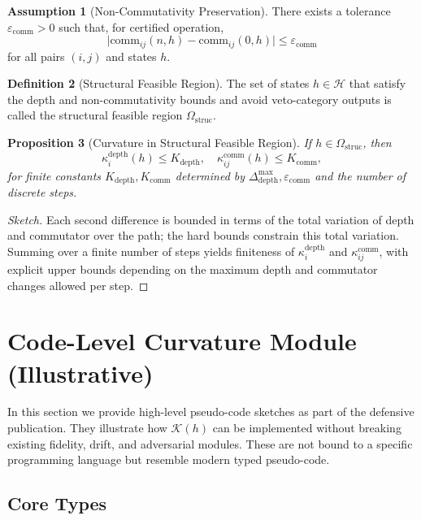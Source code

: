 \documentclass[11pt]{article}
\theoremstyle{definition}
\newtheorem{defn}{Definition}[section]
\newtheorem{assump}[defn]{Assumption}
\theoremstyle{plain}
\newtheorem{prop}[defn]{Proposition}
\theoremstyle{remark}
\begin{document}
\begin{assump}[Non-Commutativity Preservation]
There exists a tolerance \(\varepsilon_{\text{comm}}>0\) such that, for certified operation,
\[
  \big|\text{comm}_{ij}(n,h) - \text{comm}_{ij}(0,h)\big|
  \le \varepsilon_{\text{comm}}
\]
for all pairs \((i,j)\) and states \(h\).
\end{assump}

\begin{defn}[Structural Feasible Region]
The set of states \(h \in \mathcal{H}\) that satisfy the depth and non-commutativity bounds and avoid veto-category outputs is called the structural feasible region \(\Omega_{\text{struc}}\).
\end{defn}

\begin{prop}[Curvature in Structural Feasible Region]
If \(h \in \Omega_{\text{struc}}\), then
\[
  \kappa_i^{\text{depth}}(h) \le K_{\text{depth}},
  \quad
  \kappa_{ij}^{\text{comm}}(h) \le K_{\text{comm}},
\]
for finite constants \(K_{\text{depth}}, K_{\text{comm}}\) determined by \(\Delta_{\text{depth}}^{\max}, \varepsilon_{\text{comm}}\) and the number of discrete steps.
\end{prop}

\begin{proof}[Sketch]
Each second difference is bounded in terms of the total variation of depth and commutator over the path; the hard bounds constrain this total variation. Summing over a finite number of steps yields finiteness of \(\kappa_i^{\text{depth}}\) and \(\kappa_{ij}^{\text{comm}}\), with explicit upper bounds depending on the maximum depth and commutator changes allowed per step.
\end{proof}

\section{Code-Level Curvature Module (Illustrative)}

In this section we provide high-level pseudo-code sketches as part of the defensive publication. They illustrate how \(\mathcal{K}(h)\) can be implemented without breaking existing fidelity, drift, and adversarial modules. These are not bound to a specific programming language but resemble modern typed pseudo-code.

\subsection{Core Types}
\end{document}
